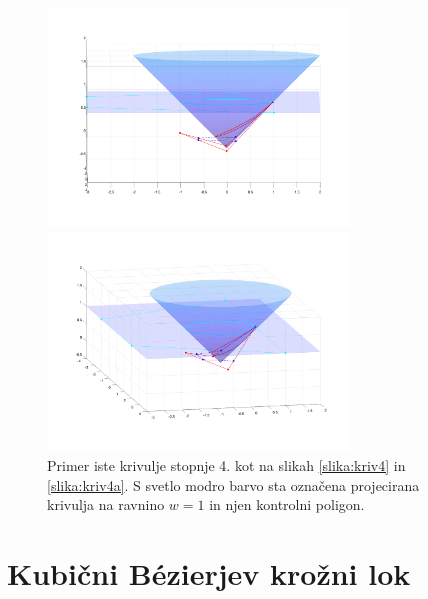 \documentclass[a4paper,11pt]{article}
\theoremstyle{definition}
\theoremstyle{plain}
\begin{document}
\begin{figure}[ht!]
    \begin{minipage}{0.5\textwidth}
        \centering
        \includegraphics[width=80mm]{kriv4_3a.png}
    \end{minipage}\hfill
    \begin{minipage}{0.5\textwidth}
        \centering
        \includegraphics[width=80mm]{kriv4_3b.png}
    \end{minipage}\hfill
    \caption{Primer iste krivulje stopnje 4. kot na slikah \ref{slika:kriv4} in \ref{slika:kriv4a}. S svetlo modro barvo sta označena projecirana krivulja na ravnino $w = 1$ in njen kontrolni poligon.}
\end{figure}



\section{Kubični B\'ezierjev krožni lok}
\end{document}
